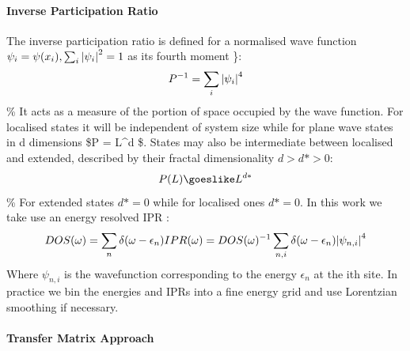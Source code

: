 \hypertarget{inverse-participation-ratio}{%
\paragraph{Inverse Participation Ratio}\label{inverse-participation-ratio}}

The inverse participation ratio is defined for a normalised wave function \(\psi_i = \psi(x_i), \sum_i \abs{\psi_i}^2 = 1\) as its fourth moment \textcite{kramerLocalizationTheoryExperiment1993}\}: \[
P^{-1} = \sum_i \abs{\psi_i}^4
\] \% It acts as a measure of the portion of space occupied by the wave function. For localised states it will be independent of system size while for plane wave states in d dimensions \$P = L\^{}d \$. States may also be intermediate between localised and extended, described by their fractal dimensionality \(d > d* > 0\): \[
P(L) \goeslike L^{d*} 
\] \% For extended states \(d* = 0\) while for localised ones \(d* = 0\). In this work we take use an energy resolved IPR \textcite{andersonAbsenceDiffusionCertain1958}: \[
DOS(\omega) = \sum_n \delta(\omega - \epsilon_n)
IPR(\omega) = DOS(\omega)^{-1} \sum_{n,i} \delta(\omega - \epsilon_n) \abs{\psi_{n,i}}^4
\] Where \(\psi_{n,i}\) is the wavefunction corresponding to the energy \(\epsilon_n\) at the ith site. In practice we bin the energies and IPRs into a fine energy grid and use Lorentzian smoothing if necessary.

\hypertarget{transfer-matrix-approach}{%
\paragraph{Transfer Matrix Approach}\label{transfer-matrix-approach}}

